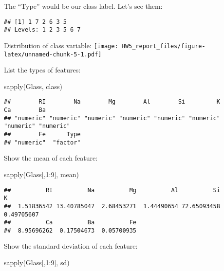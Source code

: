 \documentclass[
]{article}
\newenvironment{Shaded}{\begin{snugshade}}{\end{snugshade}}
\newcommand{\DecValTok}[1]{\textcolor[rgb]{0.00,0.00,0.81}{#1}}
\newcommand{\FunctionTok}[1]{\textcolor[rgb]{0.00,0.00,0.00}{#1}}
\newcommand{\NormalTok}[1]{#1}
\newcommand{\SpecialCharTok}[1]{\textcolor[rgb]{0.00,0.00,0.00}{#1}}
\begin{document}
The ``Type'' would be our class label. Let's see them:

\begin{Shaded}
\end{Shaded}

\begin{verbatim}
## [1] 1 7 2 6 3 5
## Levels: 1 2 3 5 6 7
\end{verbatim}

Distribution of class variable:
\texttt{[image: HW5\_report\_files/figure-latex/unnamed-chunk-5-1.pdf]}

List the types of features:

\begin{Shaded}
\begin{Highlighting}[]
\FunctionTok{sapply}\NormalTok{(Glass, class)}
\end{Highlighting}
\end{Shaded}

\begin{verbatim}
##        RI        Na        Mg        Al        Si         K        Ca        Ba 
## "numeric" "numeric" "numeric" "numeric" "numeric" "numeric" "numeric" "numeric" 
##        Fe      Type 
## "numeric"  "factor"
\end{verbatim}

Show the mean of each feature:

\begin{Shaded}
\begin{Highlighting}[]
\FunctionTok{sapply}\NormalTok{(Glass[,}\DecValTok{1}\SpecialCharTok{:}\DecValTok{9}\NormalTok{], mean)}
\end{Highlighting}
\end{Shaded}

\begin{verbatim}
##          RI          Na          Mg          Al          Si           K 
##  1.51836542 13.40785047  2.68453271  1.44490654 72.65093458  0.49705607 
##          Ca          Ba          Fe 
##  8.95696262  0.17504673  0.05700935
\end{verbatim}

Show the standard deviation of each feature:

\begin{Shaded}
\begin{Highlighting}[]
\FunctionTok{sapply}\NormalTok{(Glass[,}\DecValTok{1}\SpecialCharTok{:}\DecValTok{9}\NormalTok{], sd)}
\end{Highlighting}
\end{Shaded}
\end{document}
